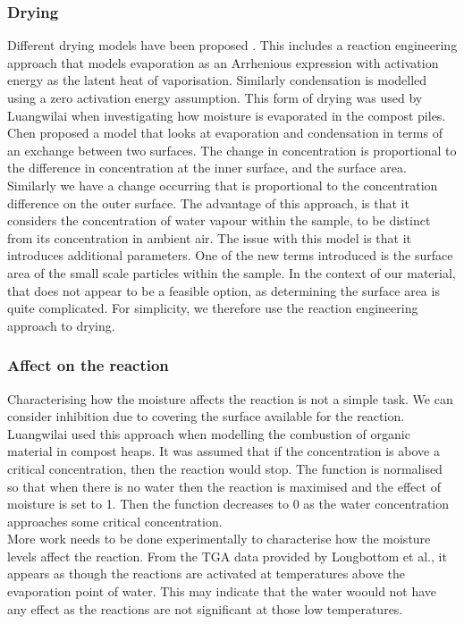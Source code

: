 \subsubsection{Drying}
Different drying models have been proposed \cite{chen98}. This includes a reaction engineering approach that models evaporation as an Arrhenious expression with activation energy as the latent heat of vaporisation. Similarly condensation is modelled using a zero activation energy assumption. This form of drying was used by Luangwilai \cite{luang11} when investigating how moisture is evaporated in the compost piles.\\
Chen \cite{chen98} proposed a model that looks at evaporation and condensation in terms of an exchange between two surfaces. The change in concentration is proportional to the difference in concentration at the inner surface, and the surface area. Similarly we have a change occurring that is proportional to the concentration difference on the outer surface. The advantage of this approach, is that it considers the concentration of water vapour within the sample, to be distinct from its concentration in ambient air. The issue with this model is that it introduces additional parameters. One of the new terms introduced is the surface area of the small scale particles within the sample. In the context of our material, that does not appear to be a feasible option, as determining the surface area is quite complicated. For simplicity, we therefore use the reaction engineering approach to drying.

\subsubsection{Affect on the reaction}
Characterising how the moisture affects the reaction is not a simple task. We can consider inhibition due to covering the surface available for the reaction. Luangwilai \cite{luang11} used this approach when modelling the combustion of organic material in compost heaps. It was assumed that if the concentration is above a critical concentration, then the reaction would stop. The function is normalised so that when there is no water then the reaction is maximised and the effect of moisture is set to 1. Then the function decreases to 0 as the water concentration approaches some critical concentration. \\
More work needs to be done experimentally to characterise how the moisture levels affect the reaction. From the TGA data provided by Longbottom et al.\cite{Ray19}, it appears as though the reactions are activated at temperatures above the evaporation point of water. This may indicate that the water woould not have any effect as the reactions are not significant at those low temperatures.



